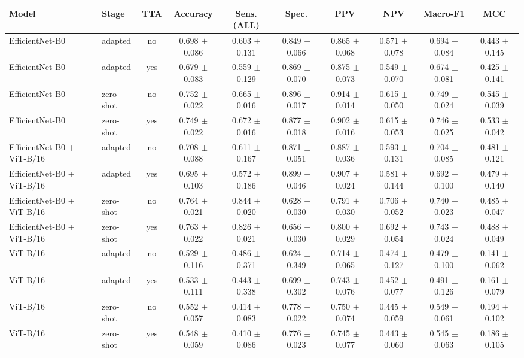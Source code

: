 \begin{tabular}{llcccccccc}
\toprule
Model & Stage & TTA & Accuracy & Sens. (ALL) & Spec. & PPV & NPV & Macro-F1 & MCC \\
\midrule
EfficientNet-B0 & adapted & no & 0.698 $\pm$ 0.086 & 0.603 $\pm$ 0.131 & 0.849 $\pm$ 0.066 & 0.865 $\pm$ 0.068 & 0.571 $\pm$ 0.078 & 0.694 $\pm$ 0.084 & 0.443 $\pm$ 0.145 \\
EfficientNet-B0 & adapted & yes & 0.679 $\pm$ 0.083 & 0.559 $\pm$ 0.129 & 0.869 $\pm$ 0.070 & 0.875 $\pm$ 0.073 & 0.549 $\pm$ 0.070 & 0.674 $\pm$ 0.081 & 0.425 $\pm$ 0.141 \\
EfficientNet-B0 & zero-shot & no & 0.752 $\pm$ 0.022 & 0.665 $\pm$ 0.016 & 0.896 $\pm$ 0.017 & 0.914 $\pm$ 0.014 & 0.615 $\pm$ 0.050 & 0.749 $\pm$ 0.024 & 0.545 $\pm$ 0.039 \\
EfficientNet-B0 & zero-shot & yes & 0.749 $\pm$ 0.022 & 0.672 $\pm$ 0.016 & 0.877 $\pm$ 0.018 & 0.902 $\pm$ 0.016 & 0.615 $\pm$ 0.053 & 0.746 $\pm$ 0.025 & 0.533 $\pm$ 0.042 \\
EfficientNet-B0 + ViT-B/16 & adapted & no & 0.708 $\pm$ 0.088 & 0.611 $\pm$ 0.167 & 0.871 $\pm$ 0.051 & 0.887 $\pm$ 0.036 & 0.593 $\pm$ 0.131 & 0.704 $\pm$ 0.085 & 0.481 $\pm$ 0.121 \\
EfficientNet-B0 + ViT-B/16 & adapted & yes & 0.695 $\pm$ 0.103 & 0.572 $\pm$ 0.186 & 0.899 $\pm$ 0.046 & 0.907 $\pm$ 0.024 & 0.581 $\pm$ 0.144 & 0.692 $\pm$ 0.100 & 0.479 $\pm$ 0.140 \\
EfficientNet-B0 + ViT-B/16 & zero-shot & no & 0.764 $\pm$ 0.021 & 0.844 $\pm$ 0.020 & 0.628 $\pm$ 0.030 & 0.791 $\pm$ 0.030 & 0.706 $\pm$ 0.052 & 0.740 $\pm$ 0.023 & 0.485 $\pm$ 0.047 \\
EfficientNet-B0 + ViT-B/16 & zero-shot & yes & 0.763 $\pm$ 0.022 & 0.826 $\pm$ 0.021 & 0.656 $\pm$ 0.030 & 0.800 $\pm$ 0.029 & 0.692 $\pm$ 0.054 & 0.743 $\pm$ 0.024 & 0.488 $\pm$ 0.049 \\
ViT-B/16 & adapted & no & 0.529 $\pm$ 0.116 & 0.486 $\pm$ 0.371 & 0.624 $\pm$ 0.349 & 0.714 $\pm$ 0.065 & 0.474 $\pm$ 0.127 & 0.479 $\pm$ 0.100 & 0.141 $\pm$ 0.062 \\
ViT-B/16 & adapted & yes & 0.533 $\pm$ 0.111 & 0.443 $\pm$ 0.338 & 0.699 $\pm$ 0.302 & 0.743 $\pm$ 0.076 & 0.452 $\pm$ 0.077 & 0.491 $\pm$ 0.126 & 0.161 $\pm$ 0.079 \\
ViT-B/16 & zero-shot & no & 0.552 $\pm$ 0.057 & 0.414 $\pm$ 0.083 & 0.778 $\pm$ 0.022 & 0.750 $\pm$ 0.074 & 0.445 $\pm$ 0.059 & 0.549 $\pm$ 0.061 & 0.194 $\pm$ 0.102 \\
ViT-B/16 & zero-shot & yes & 0.548 $\pm$ 0.059 & 0.410 $\pm$ 0.086 & 0.776 $\pm$ 0.023 & 0.745 $\pm$ 0.077 & 0.443 $\pm$ 0.060 & 0.545 $\pm$ 0.063 & 0.186 $\pm$ 0.105 \\
\bottomrule
\end{tabular}